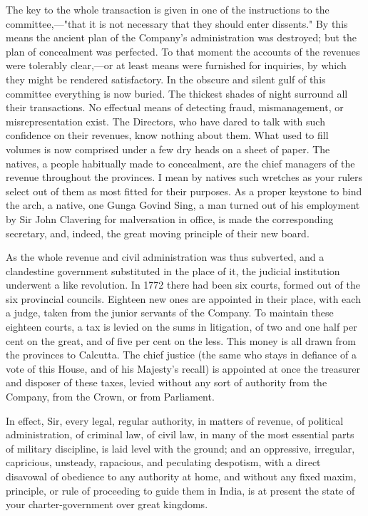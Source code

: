 The key to the whole transaction is given in one of the instructions to the committee,—"that it is not necessary that they should enter dissents." By this means the ancient plan of the Company's administration was destroyed; but the plan of concealment was perfected. To that moment the accounts of the revenues were tolerably clear,—or at least means were furnished for inquiries, by which they might be rendered satisfactory. In the obscure and silent gulf of this committee everything is now buried. The thickest shades of night surround all their transactions. No effectual means of detecting fraud, mismanagement, or misrepresentation exist. The Directors, who have dared to talk with such confidence on their revenues, know nothing about them. What used to fill volumes is now comprised under a few dry heads on a sheet of paper. The natives, a people habitually made to concealment, are the chief managers of the revenue throughout the provinces. I mean by natives such wretches as your rulers select out of them as most fitted for their purposes. As a proper keystone to bind the arch, a native, one Gunga Govind Sing, a man turned out of his employment by Sir John Clavering for malversation in office, is made the corresponding secretary, and, indeed, the great moving principle of their new board.

As the whole revenue and civil administration was thus subverted, and a clandestine government substituted in the place of it, the judicial institution underwent a like revolution. In 1772 there had been six courts, formed out of the six provincial councils. Eighteen new ones are appointed in their place, with each a judge, taken from the junior servants of the Company. To maintain these eighteen courts, a tax is levied on the sums in litigation, of two and one half per cent on the great, and of five per cent on the less. This money is all drawn from the provinces to Calcutta. The chief justice (the same who stays in defiance of a vote of this House, and of his Majesty's recall) is appointed at once the treasurer and disposer of these taxes, levied without any sort of authority from the Company, from the Crown, or from Parliament.

In effect, Sir, every legal, regular authority, in matters of revenue, of political administration, of criminal law, of civil law, in many of the most essential parts of military discipline, is laid level with the ground; and an oppressive, irregular, capricious, unsteady, rapacious, and peculating despotism, with a direct disavowal of obedience to any authority at home, and without any fixed maxim, principle, or rule of proceeding to guide them in India, is at present the state of your charter-government over great kingdoms.

